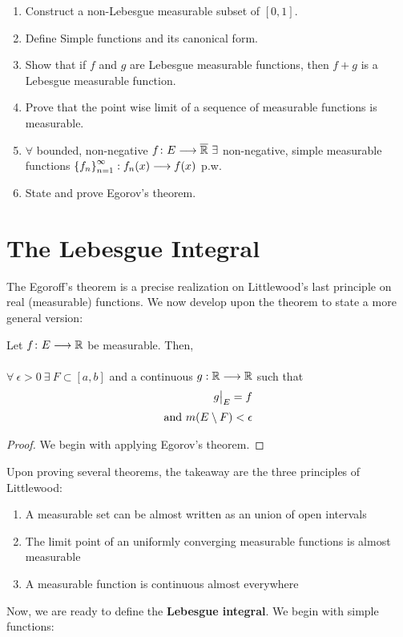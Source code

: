 \documentclass[a4paper]{book}
\begin{document}
\begin{enumerate}
\item Construct a non-Lebesgue measurable subset of $[0,1]$. 
\item Define Simple functions and its canonical form.
\item Show that if $f$ and $g$ are Lebesgue measurable functions, then $f+g$ is a Lebesgue measurable function.
\item Prove that the point wise limit of a sequence of measurable functions is measurable.
\item $\forall$ bounded, non-negative $f\colon E \longrightarrow \overline{\mathbb{R}}\ \exists $ non-negative, simple measurable functions $\qty{f_n}_{n=1}^\infty : f_n(x) \longrightarrow f(x)$ p.w.
\item State and prove Egorov's theorem.
\end{enumerate}
\chapter{The Lebesgue Integral}
The Egoroff's theorem is a precise realization on Littlewood's last principle on real (measurable) functions. We now develop upon the theorem to state a more general version:
\begin{theorem} 
Let $f\colon E \longrightarrow \mathbb{R}$ be measurable. Then, \\ \\
$\forall\ \epsilon>0\ \exists\ F \subset [a,b]$ and a continuous $g : \mathbb{R} \longrightarrow \mathbb{R}$ such that
\begin{align*}
\restr{g}{E} = f \\[2pt]
\text{and } m(E \setminus F) < \epsilon
\end{align*}
\begin{proof}
We begin with applying Egorov's theorem.
\end{proof}
\end{theorem}
Upon proving several theorems, the takeaway are the three principles of Littlewood:
\begin{enumerate}
\item A measurable set can be almost written as an union of open intervals
\item The limit point of an uniformly converging measurable functions is  almost measurable
\item A measurable function is continuous almost everywhere
\end{enumerate}
Now, we are ready to define the {\bf Lebesgue integral}. We begin with simple functions:
\end{document}
